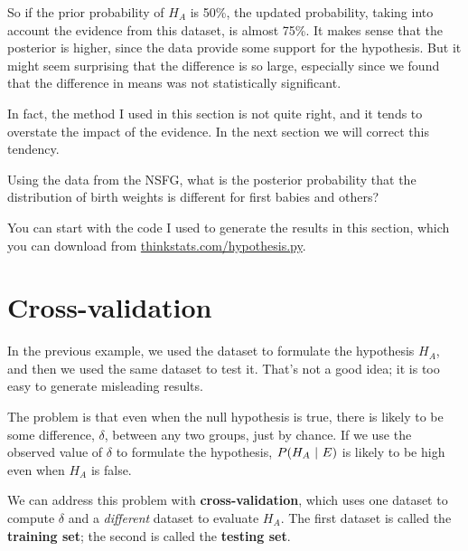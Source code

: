\documentclass[12pt]{book}
\begin{document}

So if the prior probability of $H_A$ is 50\%, the updated
probability, taking into account the evidence from this dataset,
is almost 75\%.  It makes sense that the posterior
is higher, since the data provide some support for the hypothesis.
But it might seem surprising that the difference is so large,
especially since we found that the difference in means was not
statistically significant.

In fact, the method I used in this section is not quite right, and
it tends to overstate the impact of the evidence.  In the next section
we will correct this tendency.

\begin{exercise}
Using the data from the NSFG, what is the posterior probability that
the distribution of birth weights is different for first babies and
others?


You can start with the code I used to generate the results in this
section, which you can download from \url{thinkstats.com/hypothesis.py}.


\end{exercise}


\section{Cross-validation}

In the previous example, we used the dataset to formulate the
hypothesis $H_A$, and then we used the same dataset to test it.
That's not a good idea; it is too easy to generate misleading results.

The problem is that even when the null hypothesis is true, there is
likely to be some difference, $\delta$, between any two groups, just
by chance.  If we use the observed value of $\delta$ to formulate
the hypothesis, $P(H_A ~|~ E)$ is likely to be high even when $H_A$ is
false.

We can address this problem with {\bf cross-validation}, which uses
one dataset to compute $\delta$ and a {\em different} dataset to
evaluate $H_A$.  The first dataset is called the {\bf training set};
the second is called the {\bf testing set}.

\end{document}
